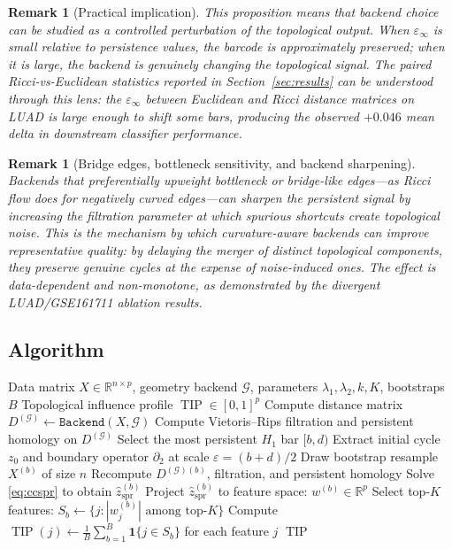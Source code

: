 \documentclass[11pt]{article}
\newtheorem{remark}[theorem]{Remark}
\DeclareMathOperator{\TIP}{TIP}
\begin{document}
\begin{remark}[Practical implication]\label{rem:perturbation}
This proposition means that backend choice can be studied as a \emph{controlled perturbation} of the topological output.
When $\varepsilon_\infty$ is small relative to persistence values, the barcode is approximately preserved; when it is large, the backend is genuinely changing the topological signal.
The paired Ricci-vs-Euclidean statistics reported in Section~\ref{sec:results} can be understood through this lens: the $\varepsilon_\infty$ between Euclidean and Ricci distance matrices on LUAD is large enough to shift some bars, producing the observed $+0.046$ mean delta in downstream classifier performance.
\end{remark}

\begin{remark}[Bridge edges, bottleneck sensitivity, and backend sharpening]\label{rem:bridge}
Backends that preferentially upweight bottleneck or bridge-like edges---as Ricci flow does for negatively curved edges---can sharpen the persistent signal by increasing the filtration parameter at which spurious shortcuts create topological noise.
This is the mechanism by which curvature-aware backends can improve representative quality: by delaying the merger of distinct topological components, they preserve genuine cycles at the expense of noise-induced ones.
The effect is data-dependent and non-monotone, as demonstrated by the divergent LUAD/GSE161711 ablation results.
\end{remark}

\subsection{Algorithm}

\begin{algorithm}[h]
\caption{CC-SPR Pipeline}
\label{alg:ccspr}
\begin{algorithmic}[1]
\REQUIRE Data matrix $X \in \mathbb{R}^{n \times p}$, geometry backend $\mathcal{G}$, parameters $\lambda_1, \lambda_2, k, K$, bootstraps $B$
\ENSURE Topological influence profile $\TIP \in [0,1]^p$
\STATE Compute distance matrix $D^{(\mathcal{G})} \gets \texttt{Backend}(X, \mathcal{G})$
\STATE Compute Vietoris--Rips filtration and persistent homology on $D^{(\mathcal{G})}$
\STATE Select the most persistent $H_1$ bar $[b, d)$
\STATE Extract initial cycle $z_0$ and boundary operator $\partial_2$ at scale $\varepsilon = (b + d)/2$
    \STATE Draw bootstrap resample $X^{(b)}$ of size $n$
    \STATE Recompute $D^{(\mathcal{G})(b)}$, filtration, and persistent homology
    \STATE Solve \eqref{eq:ccspr} to obtain $\hat{z}_{\mathrm{spr}}^{(b)}$
    \STATE Project $\hat{z}_{\mathrm{spr}}^{(b)}$ to feature space: $w^{(b)} \in \mathbb{R}^p$
    \STATE Select top-$K$ features: $S_b \gets \{j : |w^{(b)}_j| \text{ among top-}K\}$
\ENDFOR
\STATE Compute $\TIP(j) \gets \frac{1}{B} \sum_{b=1}^B \mathbf{1}\{j \in S_b\}$ for each feature $j$
\RETURN $\TIP$
\end{algorithmic}
\end{algorithm}
\end{document}
